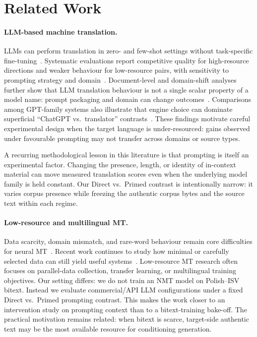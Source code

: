 
\section{Related Work}
\label{sec:related}

\paragraph{LLM-based machine translation.}
LLMs can perform translation in zero- and few-shot settings without task-specific fine-tuning~\citep{brown2020language}.
Systematic evaluations report competitive quality for high-resource directions and weaker behaviour for low-resource pairs, with sensitivity to prompting strategy and domain~\citep{hendy2023good,jiao2023chatgpt,zhu2023multilingual}.
Document-level and domain-shift analyses further show that LLM translation behaviour is not a single scalar property of a model name: prompt packaging and domain can change outcomes~\citep{hendy2023good}.
Comparisons among GPT-family systems also illustrate that engine choice can dominate superficial ``ChatGPT vs.\ translator'' contrasts~\citep{jiao2023chatgpt}.
These findings motivate careful experimental design when the target language is under-resourced: gains observed under favourable prompting may not transfer across domains or source types.

A recurring methodological lesson in this literature is that prompting is itself an experimental factor.
Changing the presence, length, or identity of in-context material can move measured translation scores even when the underlying model family is held constant.
Our Direct vs.\ Primed contrast is intentionally narrow: it varies corpus presence while freezing the authentic corpus bytes and the source text within each regime.

\paragraph{Low-resource and multilingual MT.}
Data scarcity, domain mismatch, and rare-word behaviour remain core difficulties for neural MT~\citep{koehn-knowles-2017-six}.
Recent work continues to study how minimal or carefully selected data can still yield useful systems~\citep{maillard-etal-2023-small}.
Low-resource MT research often focuses on parallel-data collection, transfer learning, or multilingual training objectives.
Our setting differs: we do not train an NMT model on Polish--ISV bitext.
Instead we evaluate commercial/API LLM configurations under a fixed Direct vs.\ Primed prompting contrast.
This makes the work closer to an intervention study on prompting context than to a bitext-training bake-off.
The practical motivation remains related: when bitext is scarce, target-side authentic text may be the most available resource for conditioning generation.

